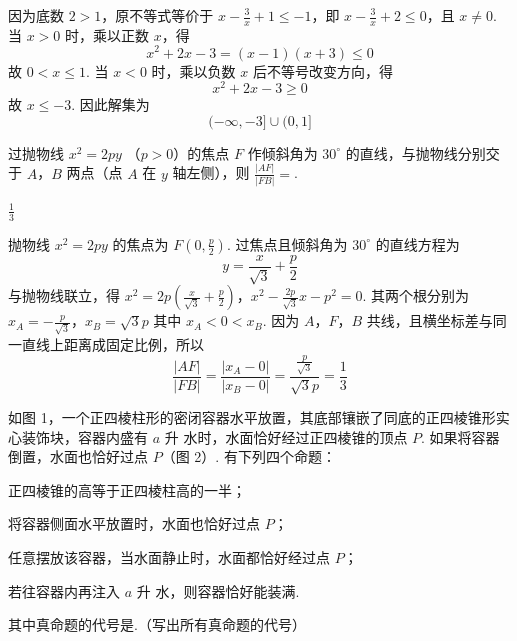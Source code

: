\begin{solution}
因为底数 \(2>1\)，原不等式等价于
\(x-\frac3x+1\leqslant-1\)，即 \(x-\frac3x+2\leqslant0\)，且 \(x\ne0\).
当 \(x>0\) 时，乘以正数 \(x\)，得
\[
x^2+2x-3=(x-1)(x+3)\leqslant0
\]
故 \(0<x\leqslant1\). 当 \(x<0\) 时，乘以负数 \(x\) 后不等号改变方向，得
\[
x^2+2x-3\geqslant0
\]
故 \(x\leqslant-3\). 因此解集为
\[
(-\infty,-3]\cup(0,1]
\]
\end{solution}

\begin{problem}
过抛物线 \(x^{2} = 2py\) （\(p > 0\)）的焦点 \(F\) 作倾斜角为 \(30^{\circ}\) 的直线，与抛物线分别交于 \(A\)，\(B\) 两点（点 \(A\) 在 \(y\) 轴左侧），则 \(\frac{|AF|}{|FB|} =\)\fillinblank{}.
\end{problem}

\begin{answer}
\(\frac{1}{3}\)
\end{answer}

\begin{solution}
抛物线 \(x^2=2py\) 的焦点为 \(F\left(0,\frac p2\right)\). 过焦点且倾斜角为 \(30^\circ\) 的直线方程为
\[
y=\frac{x}{\sqrt3}+\frac p2
\]
与抛物线联立，得
\(x^2=2p\left(\frac{x}{\sqrt3}+\frac p2\right)\)，\(x^2-\frac{2p}{\sqrt3}x-p^2=0\).
其两个根分别为
\(x_A=-\frac p{\sqrt3}\)，\(x_B=\sqrt3p\)
其中 \(x_A<0<x_B\). 因为 \(A\)，\(F\)，\(B\) 共线，且横坐标差与同一直线上距离成固定比例，所以
\[
\frac{|AF|}{|FB|}=\frac{|x_A-0|}{|x_B-0|}
=\frac{\frac{p}{\sqrt3}}{\sqrt3p}=\frac13
\]
\end{solution}

\begin{problem}
如图 1，一个正四棱柱形的密闭容器水平放置，其底部镶嵌了同底的正四棱锥形实心装饰块，容器内盛有 \(a\text{ 升}\) 水时，水面恰好经过正四棱锥的顶点 \(P\). 如果将容器倒置，水面也恰好过点 \(P\)（图 2）. 有下列四个命题：

\begin{circlelist}
\item 正四棱锥的高等于正四棱柱高的一半；
\item 将容器侧面水平放置时，水面也恰好过点 \(P\)；
\item 任意摆放该容器，当水面静止时，水面都恰好经过点 \(P\)；
\item 若往容器内再注入 \(a\text{ 升}\) 水，则容器恰好能装满.
\end{circlelist}
其中真命题的代号是\fillinblank{}.（写出所有真命题的代号）

\end{problem}

